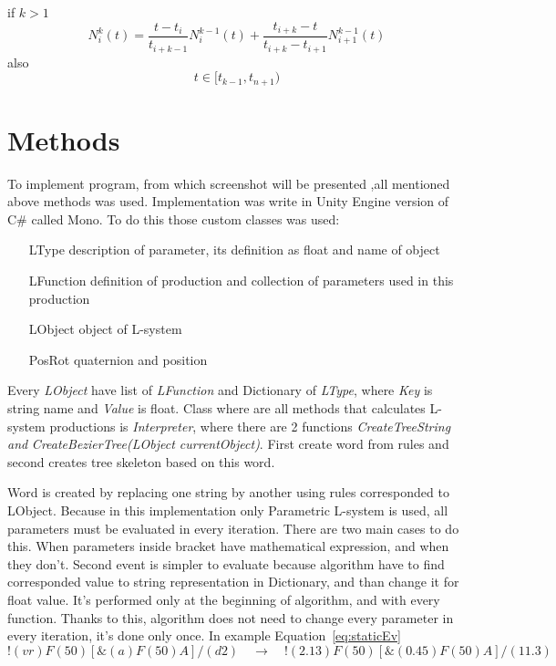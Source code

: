 \documentclass[b5paper,twoside,11pt]{article}
\begin{document}
  if $k > 1$
   \begin{equation}
  N_{i}^{k}(t)=\frac{t-t_i}{t_{i+k-1}} N_{i}^{k-1}(t) + \frac{t_{i+k} - t}{t_{i+k} - t_{i+1}} N_{i+1}^{k-1}(t)
 \end{equation}
 also
    \begin{equation}
    t\in[t_{k-1},t_{n+1})	
 \end{equation}

\section{Methods}
To implement program, from which screenshot will be presented ,all mentioned above methods was used. Implementation was write in Unity Engine version of C\# called Mono. To do this those custom classes was used:
\begin{itemize}[labelindent=5.5em,labelsep=1cm,leftmargin=*]
\item [LType] description of parameter, its definition as float and name of object
\item [LFunction] definition of production and collection of parameters used in this production
\item [LObject] object of L-system
\item [PosRot] quaternion and position
\end{itemize}
Every \textit{LObject} have list of \textit{LFunction} and Dictionary of \textit{LType}, where \textit{Key} is string name and \textit{Value} is float.
Class where are all methods that calculates L-system productions is \textit{Interpreter}, where there are 2  functions \textit{CreateTreeString and} \textit{CreateBezierTree(LObject currentObject)}. First create word from rules and second creates tree skeleton based on this word. \par
Word is created by replacing one string by another using rules corresponded to LObject. Because in this implementation only Parametric L-system is used, all parameters must be evaluated in every iteration. There are two main cases to do this. When parameters inside bracket have mathematical expression, and when they don't. Second event is simpler to evaluate because algorithm have to find corresponded value to string representation in Dictionary, and than change it for float value. It's performed only at the beginning of algorithm, and with every function. Thanks to this, algorithm does not need to change every parameter in every iteration, it's done only once.
In example Equation~\ref{eq:staticEv}
\begin{equation} \label{eq:staticEv}
!(vr)F(50)[ \&(a)F(50)A]/(d2) \quad\longrightarrow\quad !(2.13)F(50)[ \&(0.45)F(50)A]/(11.3)
 \end{equation}
\end{document}
